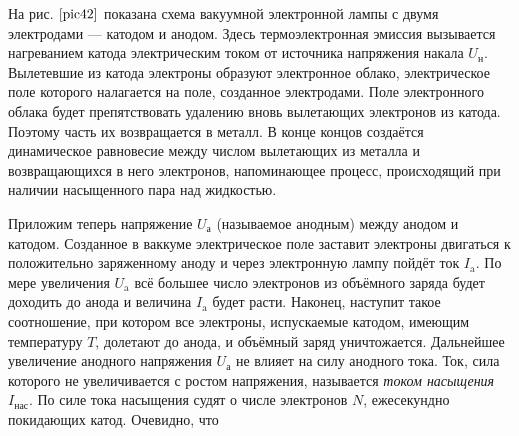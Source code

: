 \documentclass[a4paper,10pt]{book}
\begin{document}
\begin{figure}[h]
\caption{}
\label{pic42}
\end{figure}

На рис. $\ref{pic42}$ показана схема вакуумной электронной лампы с двумя электродами — катодом и анодом. Здесь термоэлектронная эмиссия вызывается нагреванием катода электрическим током от источника напряжения накала $U_\text{н}$. Вылетевшие из катода электроны образуют электронное облако, электрическое поле которого налагается на поле, созданное электродами. Поле электронного облака будет препятствовать удалению вновь вылетающих электронов из катода. Поэтому часть их возвращается в металл. В конце концов создаётся динамическое равновесие между числом вылетающих из металла и возвращающихся в него электронов, напоминающее процесс, происходящий при наличии насыщенного пара над жидкостью.

Приложим теперь напряжение $U_\text{а}$ (называемое анодным) между анодом и катодом. Созданное в ваккуме электрическое поле заставит электроны двигаться к положительно заряженному аноду и через электронную лампу пойдёт ток $I_\text{a}$. По мере увеличения $U_\text{a}$ всё большее число электронов из объёмного заряда будет доходить до анода и величина $I_\text{a}$ будет расти. Наконец, наступит такое соотношение, при котором все электроны, испускаемые катодом, имеющим температуру $T$, долетают до анода, и объёмный заряд уничтожается. Дальнейшее увеличение анодного напряжения $U_\text{а}$ не влияет на силу анодного тока. Ток, сила которого не увеличивается с ростом напряжения, называется \emph{током насыщения} $I_\text{нас}$. По силе тока насыщения судят о числе электронов $N$, ежесекундно покидающих катод. Очевидно, что
\end{document}
